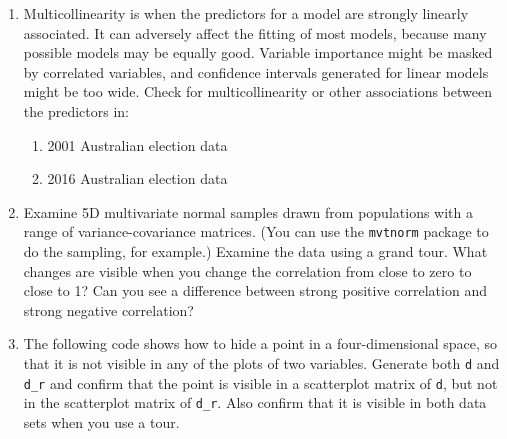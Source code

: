 \documentclass[
  letterpaper,
]{krantz}
\providecommand{\tightlist}{%
  \setlength{\itemsep}{0pt}\setlength{\parskip}{0pt}}
\begin{document}
\begin{enumerate}
\def\labelenumi{\arabic{enumi}.}
\tightlist
\item
  Multicollinearity is when the predictors for a model are strongly
  linearly associated. It can adversely affect the fitting of most
  models, because many possible models may be equally good. Variable
  importance might be masked by correlated variables, and confidence
  intervals generated for linear models might be too wide. Check for
  multicollinearity or other associations between the predictors in:

  \begin{enumerate}
  \def\labelenumii{\alph{enumii}.}
  \tightlist
  \item
    2001 Australian election data
  \item
    2016 Australian election data
  \end{enumerate}
\item
  Examine 5D multivariate normal samples drawn from populations with a
  range of variance-covariance matrices. (You can use the
  \texttt{mvtnorm} package to do the sampling, for example.) Examine the
  data using a grand tour. What changes are visible when you change the
  correlation from close to zero to close to 1? Can you see a difference
  between strong positive correlation and strong negative correlation?
\item
  The following code shows how to hide a point in a four-dimensional
  space, so that it is not visible in any of the plots of two variables.
  Generate both \texttt{d} and \texttt{d\_r} and confirm that the point
  is visible in a scatterplot matrix of \texttt{d}, but not in the
  scatterplot matrix of \texttt{d\_r}. Also confirm that it is visible
  in both data sets when you use a tour.
\end{enumerate}
\end{document}
